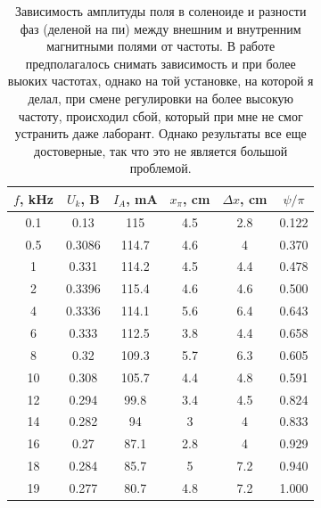 \documentclass[a4paper, 14pt]{extarticle}%
\newcommand\ECaption[1]{%
     \captionsetup{font=footnotesize}%
     \caption{#1}}
\begin{document}
\begin{table}[h!]
\begin{center}
\begin{tabular}{|c|c|c|c|c|c|}
\hline
\rowcolor[HTML]{9698ED} 
$f$, kHz & $U_k$, B & $I_A$, mA & $x_{\pi}$, cm & $\Delta x$, cm & $\psi/\pi$ \\ \hline
0.1      & 0.13     & 115       & 4.5           & 2.8            & 0.122      \\ \hline
\rowcolor[HTML]{9698ED} 
0.5      & 0.3086   & 114.7     & 4.6           & 4              & 0.370      \\ \hline
1        & 0.331    & 114.2     & 4.5           & 4.4            & 0.478      \\ \hline
\rowcolor[HTML]{9698ED} 
2        & 0.3396   & 115.4     & 4.6           & 4.6            & 0.500      \\ \hline
4        & 0.3336   & 114.1     & 5.6           & 6.4            & 0.643      \\ \hline
\rowcolor[HTML]{9698ED} 
6        & 0.333    & 112.5     & 3.8           & 4.4            & 0.658      \\ \hline
8        & 0.32     & 109.3     & 5.7           & 6.3            & 0.605      \\ \hline
\rowcolor[HTML]{9698ED} 
10       & 0.308    & 105.7     & 4.4           & 4.8            & 0.591      \\ \hline
12       & 0.294    & 99.8      & 3.4           & 4.5            & 0.824      \\ \hline
\rowcolor[HTML]{9698ED} 
14       & 0.282    & 94        & 3             & 4              & 0.833      \\ \hline
16       & 0.27     & 87.1      & 2.8           & 4              & 0.929      \\ \hline
\rowcolor[HTML]{9698ED} 
18       & 0.284    & 85.7      & 5             & 7.2            & 0.940      \\ \hline
19       & 0.277    & 80.7      & 4.8           & 7.2            & 1.000      \\ \hline
\end{tabular}
\ECaption{Зависимость амплитуды поля в соленоиде и разности фаз (деленой на пи) между внешним и внутренним магнитными полями от частоты. В работе предполагалось снимать зависимость и при более выоких частотах, однако на той установке, на которой я делал, при смене регулировки на более высокую частоту, происходил сбой, который при мне не смог устранить даже лаборант. Однако результаты все еще достоверные, так что это не является большой проблемой.}
\end{center}
\end{table}
\end{document}
